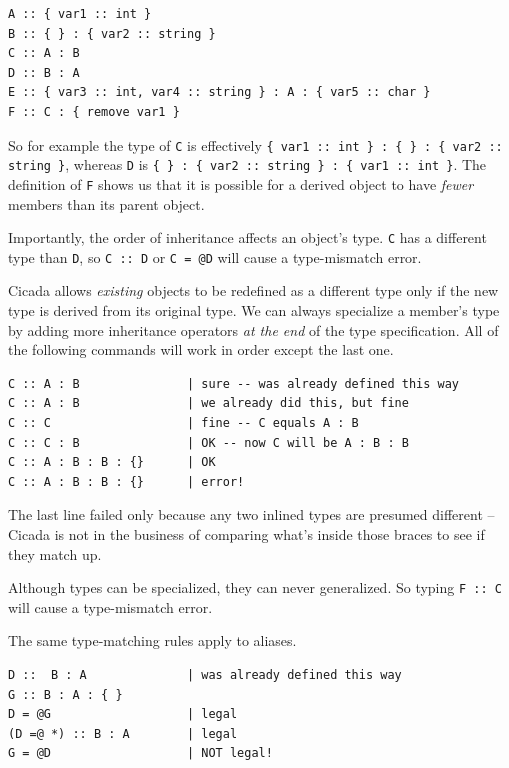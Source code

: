 \documentclass{article}
\newenvironment{code}{
       \begin{list}{}{
               \setlength{\leftmargin}{.4in}
               \setlength{\rightmargin}{0in}
               \setlength{\topsep}{.2in}
       }
       \small
       \item[] }
       { \end{list}   }
\begin{document}
\begin{code} \begin{verbatim}
A :: { var1 :: int }
B :: { } : { var2 :: string }
C :: A : B
D :: B : A
E :: { var3 :: int, var4 :: string } : A : { var5 :: char }
F :: C : { remove var1 }
\end{verbatim} \end{code}

\noindent So for example the type of \verb#C# is effectively \verb#{ var1 :: int } : { } : { var2 :: string }#, whereas \verb#D# is \verb#{ } : { var2 :: string } : { var1 :: int }#.  The definition of \verb#F# shows us that it is possible for a derived object to have \emph{fewer} members than its parent object.

Importantly, the order of inheritance affects an object's type.  \verb#C# has a different type than \verb#D#, so \verb#C :: D# or \verb#C = @D# will cause a type-mismatch error.

Cicada allows \emph{existing} objects to be redefined as a different type only if the new type is derived from its original type.  We can always specialize a member's type by adding more inheritance operators \emph{at the end} of the type specification.  All of the following commands will work in order except the last one.

\begin{code} \begin{verbatim}
C :: A : B               | sure -- was already defined this way
C :: A : B               | we already did this, but fine
C :: C                   | fine -- C equals A : B
C :: C : B               | OK -- now C will be A : B : B
C :: A : B : B : {}      | OK
C :: A : B : B : {}      | error!
\end{verbatim} \end{code}

\noindent The last line failed only because any two inlined types are presumed different -- Cicada is not in the business of comparing what's inside those braces to see if they match up.

Although types can be specialized, they can never generalized.  So typing \verb#F :: C# will cause a type-mismatch error.

The same type-matching rules apply to aliases.

\begin{code} \begin{verbatim}
D ::  B : A              | was already defined this way
G :: B : A : { }
D = @G                   | legal
(D =@ *) :: B : A        | legal
G = @D                   | NOT legal!
\end{verbatim} \end{code}
\end{document}
